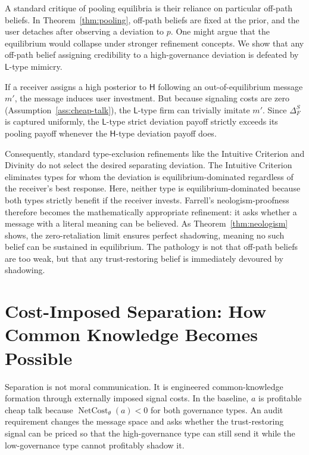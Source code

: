 \documentclass[preprint,authoryear]{elsarticle}
\theoremstyle{definition}
\theoremstyle{plain}
\begin{document}
A standard critique of pooling equilibria is their reliance on particular off-path beliefs. In Theorem~\ref{thm:pooling}, off-path beliefs are fixed at the prior, and the user detaches after observing a deviation to $p$. One might argue that the equilibrium would collapse under stronger refinement concepts. We show that any off-path belief assigning credibility to a high-governance deviation is defeated by $\mathsf{L}$-type mimicry. 

If a receiver assigns a high posterior to $\mathsf{H}$ following an out-of-equilibrium message $m'$, the message induces user investment. But because signaling costs are zero (Assumption~\ref{ass:cheap-talk}), the $\mathsf{L}$-type firm can trivially imitate $m'$. Since $\Delta_F^S$ is captured uniformly, the $\mathsf{L}$-type strict deviation payoff strictly exceeds its pooling payoff whenever the $\mathsf{H}$-type deviation payoff does. 

Consequently, standard type-exclusion refinements like the Intuitive Criterion \citep{cho_kreps1987} and Divinity \citep{banks_sobel1987} do not select the desired separating deviation. The Intuitive Criterion eliminates types for whom the deviation is equilibrium-dominated regardless of the receiver's best response. Here, neither type is equilibrium-dominated because both types strictly benefit if the receiver invests. Farrell's neologism-proofness \citep{farrell1993} therefore becomes the mathematically appropriate refinement: it asks whether a message with a literal meaning can be believed. As Theorem~\ref{thm:neologism} shows, the zero-retaliation limit ensures perfect shadowing, meaning no such belief can be sustained in equilibrium. The pathology is not that off-path beliefs are too weak, but that any trust-restoring belief is immediately devoured by shadowing.

\section{Cost-Imposed Separation: How Common Knowledge Becomes Possible}
\label{sec:cheap-talk}

Separation is not moral communication.  It is engineered common-knowledge formation through externally imposed signal costs.  In the baseline, $a$ is profitable cheap talk because $\operatorname{NetCost}_{\theta}(a)<0$ for both governance types.  An audit requirement changes the message space and asks whether the trust-restoring signal can be priced so that the high-governance type can still send it while the low-governance type cannot profitably shadow it.
\end{document}
